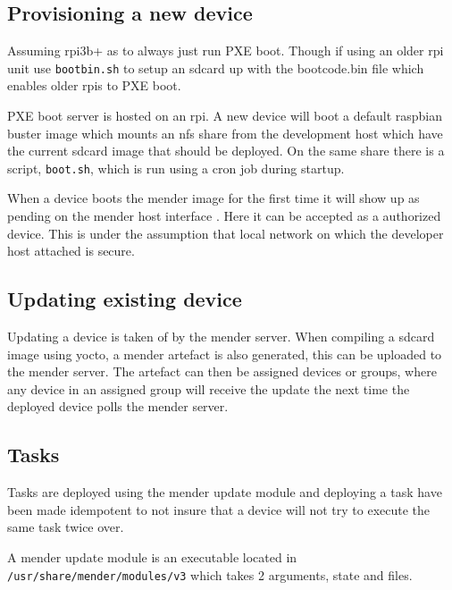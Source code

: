 \documentclass[../../main.tex]{subfiles}
\begin{document}
\subsection{Provisioning a new device}%
\label{sub:provisioning_a_new_device}
Assuming rpi3b+ as to always just run PXE boot. Though if using an older rpi unit use 
\texttt{bootbin.sh} to setup an sdcard up with the bootcode.bin file which
enables older rpis to PXE boot.

PXE boot server is hosted on an rpi. A new device will boot a default raspbian buster image
which mounts an nfs share from the development host which have the current sdcard image that 
should be deployed. On the same share there is a script, \texttt{boot.sh}, which is
run using a cron job during startup.\\


When a device boots the mender image for the first time it will show up as pending on the mender
host interface . Here it can be accepted as a authorized device.
This is under the assumption that local network on which the developer host attached is secure.


\subsection{Updating existing device}%
\label{sub:updating_existing_device}

Updating a device is taken of by the mender server. When compiling a sdcard image using yocto,
a mender artefact is also generated, this can be uploaded to the mender server.
The artefact can then be assigned devices or groups, where any device in an assigned group will
receive the update the next time the deployed device polls the mender server.



\subsection{Tasks}%
\label{sub:tasks}

Tasks are deployed using the mender update module and deploying a task have been made idempotent
to not insure that a device will not try to execute the same task twice over.

A mender update module is an executable located in \texttt{/usr/share/mender/modules/v3}
which takes 2 arguments, state and files.
\end{document}
